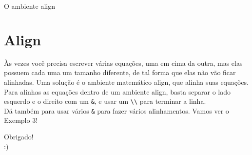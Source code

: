 \documentclass[12pt]{beamer}
\begin{document}
\begin{frame}[fragile]{O ambiente align}
  \section{Align}
  Às vezes você precisa escrever várias equações, uma em cima da outra, mas elas possuem cada uma um tamanho diferente, de tal forma que elas não vão ficar alinhadas. Uma solução é o ambiente matemático align, que alinha suas equações.
  \\[5px]

  Para alinhas as equações dentro de um ambiente align, basta separar o lado esquerdo e o direito com um \verb+&+, e usar um \verb+\\+ para terminar a linha.
  \\[5px]

  Dá também para usar vários \verb+&+ para fazer vários alinhamentos. Vamos ver o Exemplo 3!
\end{frame}

\begin{frame}
  \begin{center}
    \large Obrigado!\\
    :)
  \end{center}
\end{frame}
\end{document}
